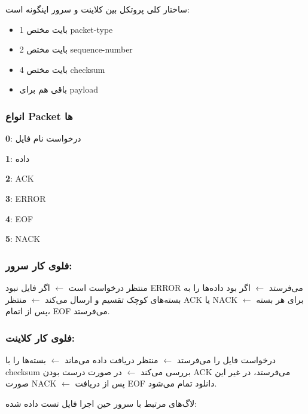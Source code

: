 ساختار کلی پروتکل بین کلاینت و سرور اینگونه است:

\begin{itemize}

\item 1 بایت مختص packet-type
\item 2 بایت مختص sequence-number
\item 4 بایت مختص checksum 
\item باقی هم برای payload 

\end{itemize}

\subsubsection*{انواع Packet ها}
\textbf{0}: درخواست نام فایل

\textbf{1}: داده

\textbf{2}: ACK

\textbf{3}: ERROR

\textbf{4}: EOF

\textbf{5}: NACK

\subsubsection*{فلوی کار سرور:}
منتظر درخواست است $\longleftarrow$ اگر فایل نبود ERROR می‌فرستد $\longleftarrow$ اگر بود داده‌ها را به بسته‌های کوچک تقسیم و ارسال می‌کند $\longleftarrow$ منتظر ACK یا NACK برای هر بسته $\longleftarrow$ پس از اتمام، EOF می‌فرستد.


\subsubsection*{فلوی کار کلاینت:}
درخواست فایل را می‌فرستد $\longleftarrow$ منتظر دریافت داده می‌ماند $\longleftarrow$ بسته‌ها را با checksum بررسی می‌کند $\longleftarrow$ در صورت درست بودن ACK می‌فرستد، در غیر این صورت NACK $\longleftarrow$ پس از دریافت EOF دانلود تمام می‌شود.

لاگ‌های مرتبط با سرور حین اجرا فایل تست داده شده:

	{
	}


